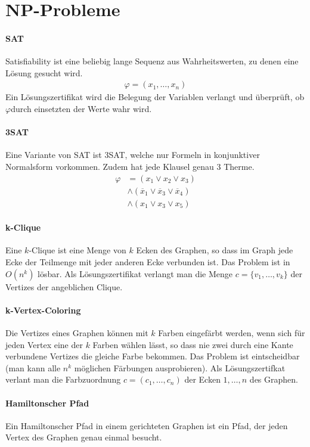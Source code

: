 \section*{NP-Probleme}
\paragraph{SAT} Satisfiability ist eine beliebig lange Sequenz aus Wahrheitswerten, zu denen eine Lösung gesucht wird. 
\begin{align*}
    \varphi = (x_1, \dots , x_n)
\end{align*}
Ein Lösungszertifikat wird die Belegung der Variablen verlangt und überprüft, ob \(\varphi\)durch einsetzten der Werte wahr wird.
\paragraph{3SAT} Eine Variante von SAT ist 3SAT, welche nur Formeln in konjunktiver Normalsform vorkommen. Zudem hat jede Klausel genau 3 Therme.
\begin{align*}
    \varphi &= (x_1 \vee x_2 \vee x_3 ) \\
    &\wedge (\overline{x}_1 \vee \overline{x}_3 \vee \overline{x}_4) \\
    &\wedge ( x_1 \vee x_3 \vee x_5)
\end{align*}
\paragraph{k-Clique} Eine \(k\)-Clique ist eine Menge von \(k\) Ecken des Graphen, so dass im Graph jede Ecke der Teilmenge mit jeder anderen Ecke verbunden ist. Das Problem ist in \(O(n^k)\) lösbar. Als Lösungszertifikat verlangt man die Menge \(c = \{v_1, \dots , v_k \}\) der Vertizes der angeblichen Clique.
\paragraph{k-Vertex-Coloring} Die Vertizes eines Graphen können mit \(k\) Farben eingefärbt werden, wenn sich für jeden Vertex eine der \(k\) Farben wählen lässt, so dass nie zwei durch eine Kante verbundene Vertizes die gleiche Farbe bekommen. Das Problem ist eintscheidbar (man kann alle \(n^k\) möglichen Färbungen ausprobieren). Als Lösungszertifkat verlant man die Farbzuordnung \(c = (c_1, \dots, c_n)\) der Ecken \(1, \dots, n\) des Graphen. 
\paragraph{Hamiltonscher Pfad} Ein Hamiltonscher Pfad in einem gerichteten Graphen ist ein Pfad, der jeden Vertex des Graphen genau einmal besucht.
